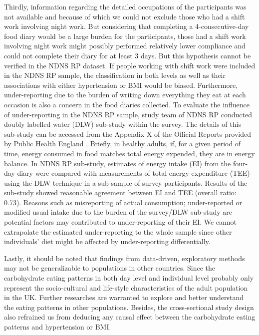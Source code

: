 Thirdly, information regarding the detailed occupations of the participants was not available and because of which we could not exclude those who had a shift work involving night work. But considering that completing a 4-consecutive-day food diary would be a large burden for the participants, those had a shift work involving night work might possibly performed relatively lower compliance and could not complete their diary for at least 3 days. But this hypothesis cannot be verified in the NDNS RP dataset. If people working with shift work were included in the NDNS RP sample, the classification in both levels as well as their associations with either hypertension or BMI would be biased. Furthermore, under-reporting due to the burden of writing down everything they eat at each occasion is also a concern in the food diaries collected. To evaluate the influence of under-reporting in the NDNS RP sample, study team of NDNS RP conducted doubly labelled water (DLW) sub-study within the survey. The details of this sub-study can be accessed from the Appendix X of the Official Reports provided by Public Health England \parencite{bates2014national,roberts2018national,NDNSofficial}. Briefly, in healthy adults, if, for a given period of time, energy consumed in food matches total energy expended, they are in energy balance. In NDNS RP sub-study, estimates of energy intake (EI) from the four-day diary were compared with measurements of total energy expenditure (TEE) using the DLW technique in a sub-sample of survey participants. Results of the sub-study showed reasonable agreement between EI and TEE (overall ratio: 0.73). Reasons such as misreporting of actual consumption; under-reported or modified usual intake due to the burden of the survey/DLW sub-study are potential factors may contributed to under-reporting of their EI. We cannot extrapolate the estimated under-reporting to the whole sample since other individuals' diet might be affected by under-reporting differentially. 

Lastly, it should be noted that findings from data-driven, exploratory methods may not be
generalizable to populations in other countries. Since the carbohydrate eating patterns in both day level and individual level probably only represent the socio-cultural and life-style characteristics of the adult population in the UK. Further researches are warranted to explore and better understand the eating patterns in other populations. Besides, the cross-sectional study design also refrained us from deducing any causal effect between the carbohydrate eating patterns and hypertension or BMI. 



